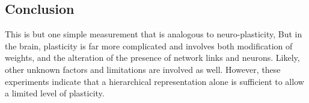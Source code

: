 \documentclass[12pt]{article}
\begin{document}
\begin{doublespacing}
	\subsection{Conclusion}
	This is but one simple measurement that is analogous to neuro-plasticity, But in the brain, plasticity is far more complicated and involves both modification of weights, and the alteration of the presence of network links and neurons. Likely, other unknown factors and limitations are involved as well. However, these experiments indicate that a hierarchical representation alone is sufficient to allow a limited level of plasticity. 

\end{doublespacing}

\nocite{huiskes08}

\singlespacing


\end{document}
